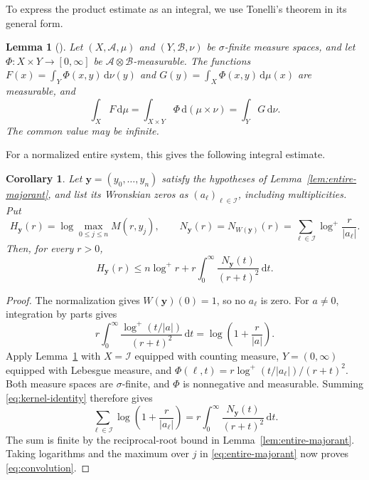 \documentclass[11pt,letterpaper,reqno]{amsart}
\newtheorem{lem}[thm]{Lemma}
\newtheorem{cor}[thm]{Corollary}
\theoremstyle{remark}
\numberwithin{equation}{section}
\newcommand{\yv}{\bm y}
\begin{document}
To express the product estimate as an integral, we use Tonelli's theorem
in its general form.

\begin{lem}[{\cite[p.~67, Theorem~2.37(a)]{Fol99}}]\label{lem:Tonelli}
Let $(X,\mathcal A,\mu)$ and $(Y,\mathcal B,\nu)$ be $\sigma$-finite
measure spaces, and let $\Phi\colon X\times Y\to[0,\infty]$ be
$\mathcal A\otimes\mathcal B$-measurable. The functions
$F(x)=\int_Y\Phi(x,y)\,\mathrm d\nu(y)$ and
$G(y)=\int_X\Phi(x,y)\,\mathrm d\mu(x)$ are measurable, and
\[
 \int_X F\,\mathrm d\mu
 =\int_{X\times Y}\Phi\,\mathrm d(\mu\times\nu)
 =\int_Y G\,\mathrm d\nu.
\]
The common value may be infinite.
\end{lem}

For a normalized entire system, this gives the following integral estimate.

\begin{cor}\label{cor:convolution}
Let $\yv=(y_0,\ldots,y_n)$ satisfy the hypotheses of
Lemma~\ref{lem:entire-majorant}, and list its Wronskian zeros as
$(a_\ell)_{\ell\in\mathcal I}$, including multiplicities. Put
\[
 H_{\yv}(r)=\log\max_{0\leq j\leq n}M(r,y_j),\qquad
 N_{\yv}(r)=N_{W(\yv)}(r)
          =\sum_{\ell\in\mathcal I}\log^+\frac r{|a_\ell|}.
\]
Then, for every $r>0$,
\begin{equation}\label{eq:convolution}
 H_{\yv}(r)\leq n\log^+r+
     r\int_0^\infty\frac{N_{\yv}(t)}{(r+t)^2}\,\mathrm dt.
\end{equation}
\end{cor}
\begin{proof}
The normalization gives $W(\yv)(0)=1$, so no $a_\ell$ is zero.
For $a\ne0$, integration by parts gives
\begin{equation}\label{eq:kernel-identity}
 r\int_0^\infty\frac{\log^+(t/|a|)}{(r+t)^2}\,\mathrm dt
 =\log\left(1+\frac r{|a|}\right).
\end{equation}
Apply Lemma~\ref{lem:Tonelli} with $X=\mathcal I$ equipped with counting
measure, $Y=(0,\infty)$ equipped with Lebesgue measure, and
$\Phi(\ell,t)=r\log^+(t/|a_\ell|)/(r+t)^2$.
Both measure spaces are $\sigma$-finite, and $\Phi$ is nonnegative and
measurable. Summing \eqref{eq:kernel-identity} therefore gives
\[
 \sum_{\ell\in\mathcal I}\log\left(1+\frac r{|a_\ell|}\right)
 =r\int_0^\infty\frac{N_{\yv}(t)}{(r+t)^2}\,\mathrm dt.
\]
The sum is finite by the reciprocal-root bound in
Lemma~\ref{lem:entire-majorant}. Taking logarithms and the maximum over
$j$ in \eqref{eq:entire-majorant} now proves \eqref{eq:convolution}.
\end{proof}
\end{document}
